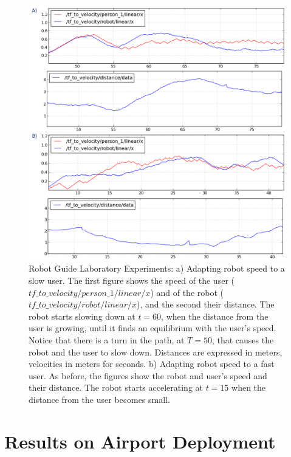 \begin{figure}[ht!]
	\centering
	\includegraphics[scale=0.5]{img/case_study/spencer/experiments.png}
	\caption[Robot Guide laboratory experiment]{Robot Guide Laboratory Experiments: a) Adapting robot speed to a slow user. The first figure shows the speed of the user ($tf\_to\_velocity/person\_1/linear/x$) and of the robot ($tf\_to\_velocity/robot/linear/x$), and the second their distance. The robot starts slowing down at $t=60$, when the distance from the user is growing, until it finds an equilibrium with the user's speed. Notice that there is a turn in the path, at $T=50$, that causes the robot and the user to slow down. Distances are expressed in meters, velocities in meters for seconds.
b) Adapting robot speed to a fast user. As before, the figures show the robot and user's speed and their distance. The robot starts accelerating at $t=15$  when the distance from the user becomes small.}
	\label{fig:case_study-spencer-exp_lab_result}
\end{figure}

\section{Results on Airport Deployment}
\label{sec:spencer-airport}
